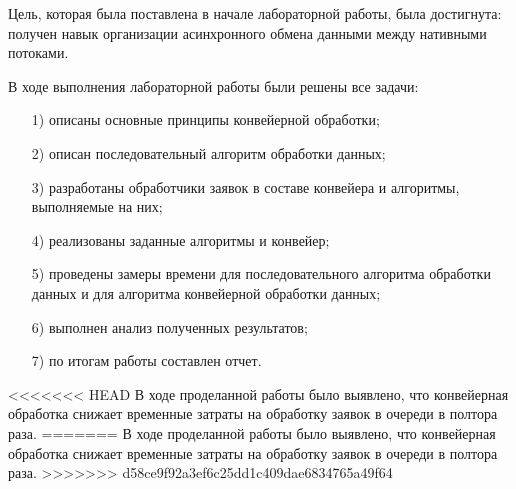 
Цель, которая была поставлена в начале лабораторной работы, была достигнута: получен навык организации асинхронного обмена данными между нативными потоками.

В ходе выполнения лабораторной работы были решены все задачи:
\begin{enumerate}[itemindent=1.25em]
	\item[1)] описаны основные принципы конвейерной обработки;
\item[2)] описан последовательный алгоритм обработки данных;
\item[3)]
разработаны обработчики заявок в составе конвейера и алгоритмы, выполняемые на них;
\item[4)] реализованы заданные алгоритмы и конвейер;
\item[5)] проведены замеры времени для последовательного алгоритма обработки данных и для алгоритма конвейерной обработки данных;%
\item[6)] выполнен анализ полученных результатов;
\item[7)] по итогам работы составлен отчет.
\end{enumerate}


<<<<<<< HEAD
В ходе проделанной работы было выявлено, что конвейерная обработка снижает временные затраты на обработку заявок в очереди в полтора раза. 
=======
В ходе проделанной работы было выявлено, что конвейерная обработка снижает временные затраты на обработку заявок в очереди в полтора раза.
>>>>>>> d58ce9f92a3ef6c25dd1c409dae6834765a49f64
